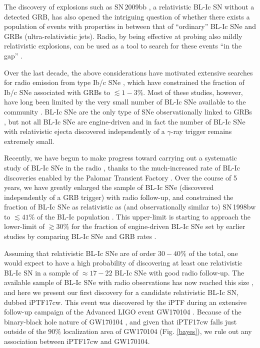 \documentclass[twocolumn]{emulateapj}
\begin{document}
The discovery of explosions such as SN\,2009bb \citep{Soderberg2010}, a relativistic 
BL-Ic SN without a detected GRB, has also opened the intriguing question of whether there exists a population of events with properties in between that of ``ordinary'' BL-Ic SNe and GRBs (ultra-relativistic jets).  Radio, 
by being effective at probing also mildly relativistic explosions, can be used as a tool to search for these events ``in the gap'' \citep[see also][]{Ofek2007,Milisavljevic2015}.

Over the last decade, the above considerations have motivated extensive searches for radio emission from type Ib/c SNe \citep[e.g.,][]{Berger2003,Soderberg2006,Bietenholz2013}, which have constrained the fraction of Ib/c SNe associated with GRBs to $\lesssim 1-3\%$. Most of these studies, however, have long been limited by the very small number of BL-Ic SNe available to the community \citep{Berger2003,ATEL2483,Soderberg2010,ATEL3101,Drake2013,ATEL4997,Salas2013,Cha2015,Milisavljevic2015}. BL-Ic SNe are the only type of SNe observationally linked to GRBs \citep{Bloom2006}, but not all BL-Ic SNe are engine-driven and in fact the number of BL-Ic SNe with relativistic ejecta discovered independently of a $\gamma$-ray trigger remains extremely small.

Recently, we have begun to make progress toward carrying out a systematic study of BL-Ic SNe in the radio \citep{Corsi2011,Corsi2014,Corsi2016}, thanks to the much-increased rate of BL-Ic discoveries enabled by the Palomar Transient Factory \citep[PTF and its successor, the iPTF;][]{Law2009,Rau2009}. Over the course of 5 years, we have greatly enlarged the sample of BL-Ic SNe (discovered independently of a GRB trigger) with radio follow-up, and constrained the fraction of BL-Ic SNe as relativistic as (and observationally similar to) SN\,1998bw to $\lesssim 41\%$ of the BL-Ic population \citep[99.865\% confidence;][]{Corsi2016}. This upper-limit is starting to approach the lower-limit of $\gtrsim 30\%$ for the fraction of engine-driven BL-Ic SNe set by earlier studies by comparing BL-Ic SNe and GRB rates \citep{Podsiadlowski2004}. 

Assuming that relativistic BL-Ic SNe are of order $30-40\%$ of the total, one would expect to have a high probability of discovering at least one relativistic BL-Ic SN in a sample of $\approx 17-22$ BL-Ic SNe with good radio follow-up. The available sample of BL-Ic SNe with radio observations has now reached this size \citep{Corsi2016}, and here we present our first discovery for a candidate relativistic BL-Ic SN, dubbed  iPTF17cw. This event was discovered by the iPTF during an extensive follow-up campaign of the Advanced LIGO event GW170104 \citep{LVC20364,LVC20385,LVC20398,LVC20419,LVC20428,LVC20473,LVC21056}. Because of the binary-black hole nature of GW170104 \citep{Abbott2017}, and given that iPTF17cw falls just outside of the $90\%$ localization area of GW170104 (Fig. \ref{bayes}), we rule out any association between iPTF17cw and GW170104.  
\end{document}
